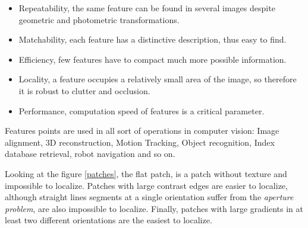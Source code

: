 \begin{itemize}

\item Repeatability, the same feature can be found in several images despite geometric and photometric transformations.

\item Matchability, each feature has a distinctive description, thus easy to find.

\item Efficiency, few features have to compact much more possible information.

\item Locality, a feature occupies a relatively small area of the image, so therefore it is robust to clutter and occlusion.

\item Performance, computation speed of features is a critical parameter. 

\end{itemize}

Features points are used in all sort of operations in computer vision: Image alignment, 3D reconstruction, Motion Tracking, Object recognition, Index database retrieval, robot navigation and so on.

Looking at the figure \ref{patches}, the flat patch, is a patch without texture and impossible to localize. Patches with large contrast edges are easier to localize, although straight lines segments at a single orientation suffer from the \textit{aperture problem}, are also impossible to localize. Finally, patches with large gradients in at least two different orientations are the easiest to localize.

